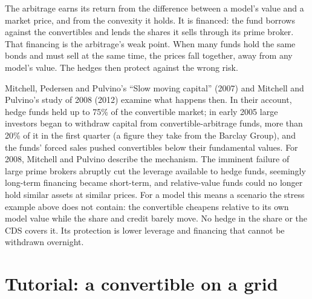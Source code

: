 The arbitrage earns its return from the difference between a model's value and a market price, and from the convexity it holds. It is financed:
the fund borrows against the convertibles and lends the shares it sells through its prime broker. That financing is the arbitrage's weak point. When
many funds hold the same bonds and must sell at the same time, the prices fall together, away from any model's value. The hedges then protect
against the wrong risk.

Mitchell, Pedersen and Pulvino's ``Slow moving capital'' (2007) and Mitchell and Pulvino's study of 2008 (2012) examine what happens then.
In their account, hedge funds held up to 75\% of the convertible market; in early 2005 large investors began to withdraw capital from
convertible-arbitrage funds, more than 20\% of it in the first quarter (a figure they take from the Barclay Group), and the funds' forced
sales pushed convertibles below their fundamental values. For 2008, Mitchell and Pulvino describe the mechanism. The imminent failure of large prime brokers abruptly cut the leverage available to hedge funds,
seemingly long-term financing became short-term, and relative-value funds could no longer hold similar assets at similar prices. For a model this
means a scenario the stress example above does not contain: the convertible cheapens relative to its own model value while the share and credit
barely move. No hedge in the share or the CDS covers it. Its protection is lower leverage and financing that cannot be withdrawn overnight.

\section{Tutorial: a convertible on a grid}\label{tut:dv:convertibles-and-the-credit-equity-link:tut}

